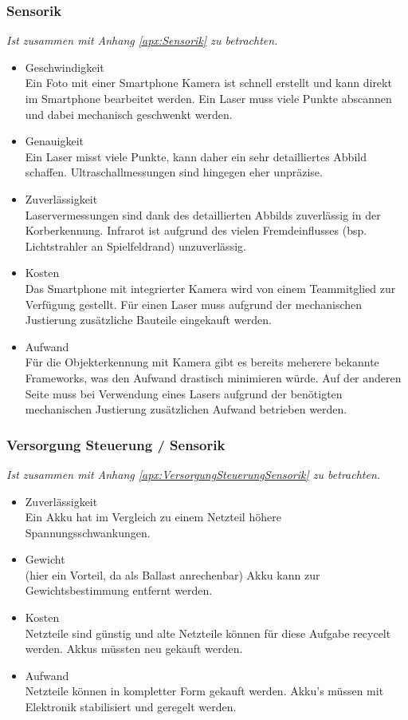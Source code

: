 		\subsubsection{Sensorik}
			\textit{Ist zusammen mit Anhang \ref{apx:Sensorik} zu betrachten.}
			\begin{itemize}
				\item Geschwindigkeit\\
				Ein Foto mit einer Smartphone Kamera ist schnell erstellt und kann direkt im Smartphone bearbeitet werden. Ein Laser muss viele Punkte abscannen und dabei mechanisch geschwenkt werden.
				\item Genauigkeit\\
				Ein Laser misst viele Punkte, kann daher ein sehr detailliertes Abbild schaffen. Ultraschallmessungen sind hingegen eher unpräzise.  
				\item Zuverlässigkeit\\
				Laservermessungen sind dank des detaillierten Abbilds zuverlässig in der Korberkennung. Infrarot ist aufgrund des vielen Fremdeinflusses (bsp. Lichtstrahler an Spielfeldrand) unzuverlässig.
				\item Kosten\\
				Das Smartphone mit integrierter Kamera wird von einem Teammitglied zur Verfügung gestellt. Für einen Laser muss aufgrund der mechanischen Justierung zusätzliche Bauteile eingekauft werden.
				\item Aufwand\\
				Für die Objekterkennung mit Kamera gibt es bereits meherere bekannte Frameworks, was den Aufwand drastisch minimieren würde. Auf der anderen Seite muss bei Verwendung eines Lasers aufgrund der benötigten mechanischen Justierung zusätzlichen Aufwand betrieben werden.
			\end{itemize}
			
		\subsubsection{Versorgung Steuerung / Sensorik}
			\textit{Ist zusammen mit Anhang \ref{apx:VersorgungSteuerungSensorik} zu betrachten.}
			\begin{itemize}
				\item Zuverlässigkeit\\
				Ein Akku hat im Vergleich zu einem Netzteil höhere Spannungsschwankungen.
				\item Gewicht\\
				(hier ein Vorteil, da als Ballast anrechenbar) Akku kann zur Gewichtsbestimmung entfernt werden.
				\item Kosten\\
				Netzteile sind günstig und alte Netzteile können für diese Aufgabe recycelt werden. Akkus müssten neu gekauft werden.
				\item Aufwand\\
				Netzteile können in kompletter Form gekauft werden. Akku’s müssen mit Elektronik stabilisiert und geregelt werden.
			\end{itemize}	
		
